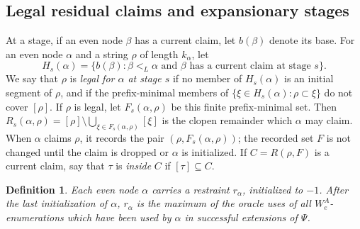 \documentclass[10pt,a4paper]{amsart}
\newtheorem{definition}[theorem]{Definition}
\begin{document}
\subsection{Legal residual claims and expansionary stages}
At a stage, if an even node $\beta$ has a current claim, let $b(\beta)$ denote
its base.  For an even node $\alpha$ and a string $\rho$ of length
$k_\alpha$, let
\[
   H_s(\alpha)=\{b(\beta):\beta<_L\alpha\text{ and }\beta
          \text{ has a current claim at stage }s\}.
\]
We say that $\rho$ is \emph{legal for $\alpha$ at stage $s$} if no member of
$H_s(\alpha)$ is an initial segment of $\rho$, and if the prefix-minimal
members of $\{\xi\in H_s(\alpha):\rho\subset \xi\}$
do not cover $[\rho]$.  If $\rho$ is legal, let $F_s(\alpha,\rho)$ be this
finite prefix-minimal set.  Then $R_s(\alpha,
\rho)=[\rho]\setminus
       \bigcup_{\xi\in F_s(\alpha,
\rho)}[\xi]$
is the clopen remainder which $\alpha$ may claim.  When $\alpha$ claims
$\rho$, it records the pair $(\rho,F_s(\alpha,
\rho))$; the recorded set $F$ is
not changed until the claim is dropped or $\alpha$ is initialized.
If $C=R(\rho,F)$ is a current claim, say
that $\tau$ is \emph{inside} $C$ if $[\tau]\subseteq C$. 

\begin{definition}
    Each even node $\alpha$ carries a \emph{restraint} $r_\alpha$,
initialized to $-1$.  After the last initialization of $\alpha$,
$r_\alpha$ is the maximum of the oracle uses of all $W_e^A$-enumerations which
have been used by $\alpha$ in successful extensions of $\Psi$.
\end{definition}
\end{document}
